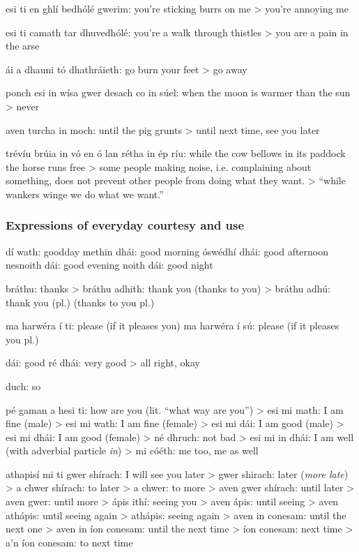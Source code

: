 esi ti en ghl\'{i} bedh\'{o}l\'{e} gwerim: you're sticking burrs on me
> you're annoying me

esi ti camath tar dhuvedh\'{o}l\'{e}: you're a walk through thistles
> you are a pain in the arse

\'{a}i a dhauni t\'{o} dhathr\'{a}ieth: go burn your feet
> go away

ponch esi in w\'{i}sa gwer desach co in s\'{u}el: when the moon is warmer than the sun
> never

aven turcha in moch: until the pig grunts
> until next time, see you later

tr\'{e}v\'{i}u br\'{u}ia in v\'{o} en \'{o} lan r\'{e}tha in \'{e}p r\'{i}u: while the cow bellows in its paddock the horse runs free
> some people making noise, i.e. complaining about something, does not prevent other people from doing what they want. > ``while wankers winge we do what we want.''

\subsubsection{Expressions of everyday courtesy and use}

d\'{i} wath: goodday
methin dh\'{a}i: good morning
\'{o}sw\'{e}dh\'{i} dh\'{a}i: good afternoon
nesnoith d\'{a}i: good evening
noith d\'{a}i: good night

br\'{a}thu: thanks
> br\'{a}thu adhith: thank you (thanks to you)
> br\'{a}thu adh\'{u}: thank you (pl.) (thanks to you pl.)

ma harw\'{e}ra \'{i} ti: please (if it pleases you)
ma harw\'{e}ra \'{i} s\'{u}: please (if it pleases you pl.)

d\'{a}i: good
r\'{e} dh\'{a}i: very good
> all right, okay

duch: so

p\'{e} gaman a hesi ti: how are you (lit. ``what way are you'')
> esi mi math: I am fine (male)
> esi mi wath: I am fine (female)
> esi mi d\'{a}i: I am good (male)
> esi mi dh\'{a}i: I am good (female)
> n\'{e} dhruch: not bad
> esi mi in dh\'{a}i: I am well (with adverbial particle \textit{in})
> mi c\'{o}\'{e}th: me too, me as well

athapis\'{i} mi ti gwer sh\'{i}rach: I will see you later
> gwer shirach: later (\textit{more late})
> a chwer sh\'{i}rach: to later
> a chwer: to more
> aven gwer sh\'{i}rach: until later
> aven gwer: until more
> \'{a}pis ith\'{i}: seeing you
> aven \'{a}pis: until seeing
> aven ath\'{a}pis: until seeing again
> ath\'{a}pis: seeing again
> aven in conesam: until the next one
> aven in \'{i}on conesam: until the next time
> \'{i}on conesam: next time
> a'n \'{i}on conesam: to next time


